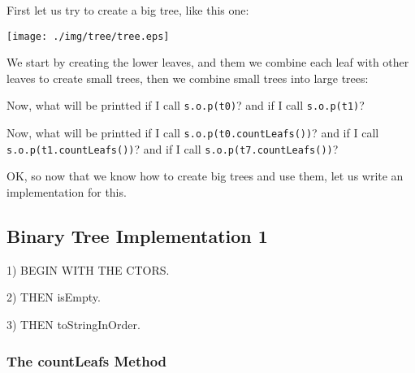 \documentclass[a4paper, 9pt]{extarticle}
\begin{document}
First let us try to create a big tree, like this one:

\begin{center}
  \texttt{[image: ./img/tree/tree.eps]}
\end{center}

We start by creating the lower leaves, and them we combine each leaf with other
leaves to create small trees, then we combine small trees into large trees:

\begin{multicols}{2}
\end{multicols}

Now, what will be printted if I call \texttt{s.o.p(t0)}?
and if I call \texttt{s.o.p(t1)}?

Now, what will be printted if I call \texttt{s.o.p(t0.countLeafs())}?
and if I call \texttt{s.o.p(t1.countLeafs())}?
and if I call \texttt{s.o.p(t7.countLeafs())}?

OK, so now that we know how to create big trees and use them, let us write an
implementation for this.

\newpage
\subsection{Binary Tree Implementation 1}

\begin{multicols}{2}

  1) BEGIN WITH THE CTORS.

  2) THEN isEmpty.

  3) THEN toStringInOrder.
\end{multicols}



\newpage
\subsubsection{The countLeafs Method}

\begin{multicols}{2}
  \columnbreak
{}
\end{multicols}
\end{document}
